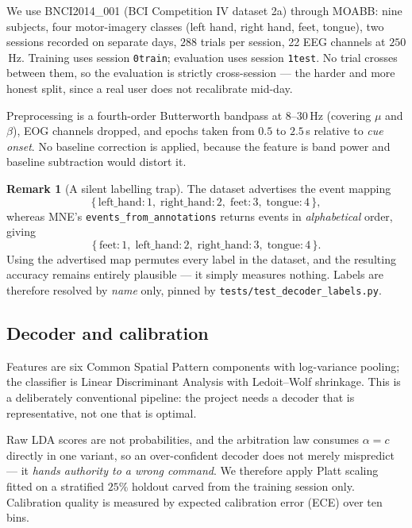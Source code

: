 \documentclass[11pt,a4paper]{article}
\theoremstyle{plain}
\theoremstyle{definition}
\newtheorem{remark}{Remark}
\begin{document}
We use BNCI2014\_001 (BCI Competition IV dataset 2a) through MOABB:
nine subjects, four motor-imagery classes (left hand, right hand, feet,
tongue), two sessions recorded on separate days, $288$ trials per
session, 22 EEG channels at $250$\,Hz. Training uses session
\texttt{0train}; evaluation uses session \texttt{1test}. No trial
crosses between them, so the evaluation is strictly cross-session ---
the harder and more honest split, since a real user does not recalibrate
mid-day.

Preprocessing is a fourth-order Butterworth bandpass at $8$--$30$\,Hz
(covering $\mu$ and $\beta$), EOG channels dropped, and epochs taken
from $0.5$ to $2.5$\,s relative to \emph{cue onset}. No baseline
correction is applied, because the feature is band power and baseline
subtraction would distort it.

\begin{remark}[A silent labelling trap]
The dataset advertises the event mapping
\[
\{\,\text{left\_hand}{:}1,\;\text{right\_hand}{:}2,\;
   \text{feet}{:}3,\;\text{tongue}{:}4\,\},
\]
whereas MNE's \texttt{events\_from\_annotations} returns events in
\emph{alphabetical} order, giving
\[
\{\,\text{feet}{:}1,\;\text{left\_hand}{:}2,\;
   \text{right\_hand}{:}3,\;\text{tongue}{:}4\,\}.
\]
Using the advertised map permutes every label in
the dataset, and the resulting accuracy remains entirely plausible ---
it simply measures nothing. Labels are therefore resolved by
\emph{name} only, pinned by
\texttt{tests/test\_decoder\_labels.py}.
\end{remark}

\subsection{Decoder and calibration}

Features are six Common Spatial Pattern components with log-variance
pooling; the classifier is Linear Discriminant Analysis with
Ledoit--Wolf shrinkage. This is a deliberately conventional pipeline:
the project needs a decoder that is representative, not one that is
optimal.

Raw LDA scores are not probabilities, and the arbitration law consumes
$\alpha = c$ directly in one variant, so an over-confident decoder does
not merely mispredict --- it \emph{hands authority to a wrong command}.
We therefore apply Platt scaling fitted on a stratified $25\%$ holdout
carved from the training session only. Calibration quality is measured
by expected calibration error (ECE) over ten bins.
\end{document}
